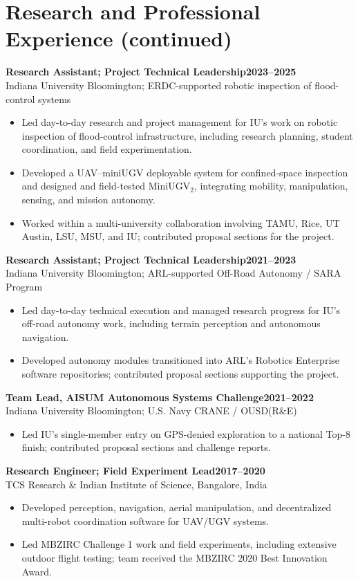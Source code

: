 \documentclass[11pt,letterpaper]{article}
\newcommand{\entry}[3]{\Needspace{4\baselineskip}\textbf{#1}\hfill\textbf{#2}\\#3\par}
\begin{document}
\section{Research and Professional Experience (continued)}
\entry{Research Assistant; Project Technical Leadership}{2023--2025}{Indiana University Bloomington; ERDC-supported robotic inspection of flood-control systems}
\begin{itemize}
\item Led day-to-day research and project management for IU's work on robotic inspection of flood-control infrastructure, including research planning, student coordination, and field experimentation.
\item Developed a UAV--miniUGV deployable system for confined-space inspection and designed and field-tested MiniUGV$_2$, integrating mobility, manipulation, sensing, and mission autonomy.
\item Worked within a multi-university collaboration involving TAMU, Rice, UT Austin, LSU, MSU, and IU; contributed proposal sections for the project.
\end{itemize}
\entry{Research Assistant; Project Technical Leadership}{2021--2023}{Indiana University Bloomington; ARL-supported Off-Road Autonomy / SARA Program}
\begin{itemize}
\item Led day-to-day technical execution and managed research progress for IU's off-road autonomy work, including terrain perception and autonomous navigation.
\item Developed autonomy modules transitioned into ARL's Robotics Enterprise software repositories; contributed proposal sections supporting the project.
\end{itemize}
\entry{Team Lead, AISUM Autonomous Systems Challenge}{2021--2022}{Indiana University Bloomington; U.S. Navy CRANE / OUSD(R\&E)}
\begin{itemize}
\item Led IU's single-member entry on GPS-denied exploration to a national Top-8 finish; contributed proposal sections and challenge reports.
\end{itemize}
\entry{Research Engineer; Field Experiment Lead}{2017--2020}{TCS Research \& Indian Institute of Science, Bangalore, India}
\begin{itemize}
\item Developed perception, navigation, aerial manipulation, and decentralized multi-robot coordination software for UAV/UGV systems.
\item Led MBZIRC Challenge 1 work and field experiments, including extensive outdoor flight testing; team received the MBZIRC 2020 Best Innovation Award.
\end{itemize}
\end{document}
